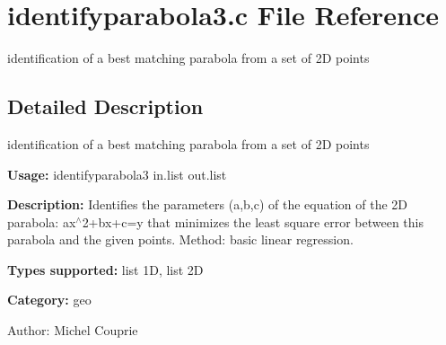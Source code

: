 \section{identifyparabola3.c File Reference}
\label{identifyparabola3_8c}
identification of a best matching parabola from a set of 2D points 



\subsection{Detailed Description}
identification of a best matching parabola from a set of 2D points 

{\bf Usage:} identifyparabola3 in.list out.list

{\bf Description:} Identifies the parameters (a,b,c) of the equation of the 2D parabola: ax$^\wedge$2+bx+c=y that minimizes the least square error between this parabola and the given points. Method: basic linear regression.

{\bf Types supported:} list 1D, list 2D

{\bf Category:} geo

\begin{Desc}
\item[Author:]Michel Couprie \end{Desc}
